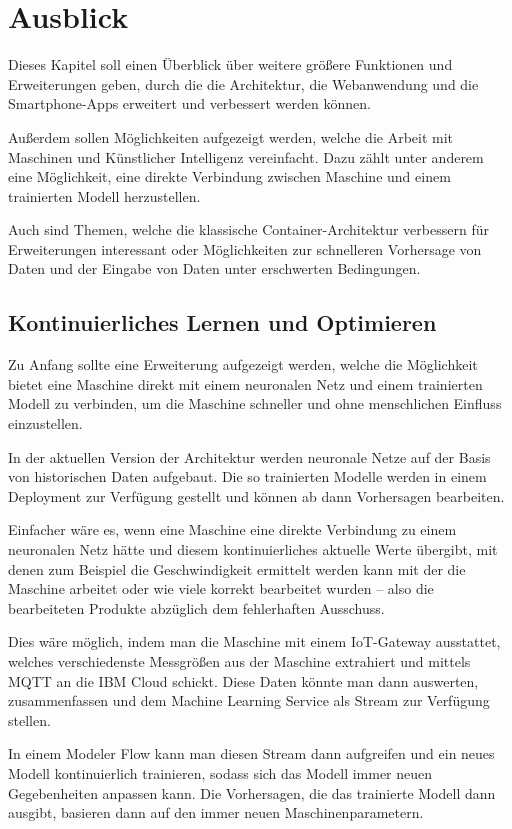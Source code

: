 \chapter{Ausblick}
\label{ch:ausblick}
Dieses Kapitel soll einen Überblick über weitere größere Funktionen und Erweiterungen geben, durch die die Architektur,
die Webanwendung und die Smartphone-Apps erweitert und verbessert werden können.

Außerdem sollen Möglichkeiten aufgezeigt werden, welche die Arbeit mit Maschinen und Künstlicher Intelligenz
vereinfacht. Dazu zählt unter anderem eine Möglichkeit, eine direkte Verbindung zwischen Maschine und einem trainierten
Modell herzustellen.

Auch sind Themen, welche die klassische Container-Architektur verbessern für Erweiterungen interessant oder
Möglichkeiten zur schnelleren Vorhersage von Daten und der Eingabe von Daten unter erschwerten Bedingungen.

\section{Kontinuierliches Lernen und Optimieren}
Zu Anfang sollte eine Erweiterung aufgezeigt werden, welche die Möglichkeit bietet eine Maschine direkt mit einem
neuronalen Netz und einem trainierten Modell zu verbinden, um die Maschine schneller und ohne menschlichen Einfluss
einzustellen.

In der aktuellen Version der Architektur werden neuronale Netze auf der Basis von historischen Daten aufgebaut. Die so
trainierten Modelle werden in einem Deployment zur Verfügung gestellt und können ab dann Vorhersagen bearbeiten.

Einfacher wäre es, wenn eine Maschine eine direkte Verbindung zu einem neuronalen Netz hätte und diesem kontinuierliches
aktuelle Werte übergibt, mit denen zum Beispiel die Geschwindigkeit ermittelt werden kann mit der die Maschine arbeitet
oder wie viele korrekt bearbeitet wurden -- also die bearbeiteten Produkte abzüglich dem fehlerhaften Ausschuss.

Dies wäre möglich, indem man die Maschine mit einem IoT-Gateway ausstattet, welches verschiedenste Messgrößen aus der
Maschine extrahiert und mittels MQTT an die IBM Cloud schickt. Diese Daten könnte man dann auswerten, zusammenfassen
und dem Machine Learning Service als Stream zur Verfügung stellen.

In einem Modeler Flow kann man diesen Stream dann aufgreifen und ein neues Modell kontinuierlich trainieren, sodass sich
das Modell immer neuen Gegebenheiten anpassen kann. Die Vorhersagen, die das trainierte Modell dann ausgibt, basieren
dann auf den immer neuen Maschinenparametern.

